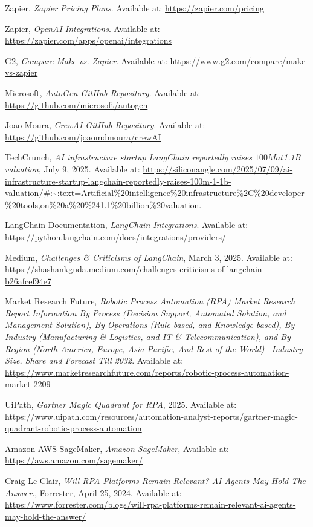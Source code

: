 \documentclass[11pt, a4paper, oneside]{article}
\begin{document}
\begin{thebibliography}{99}
    Zapier, \textit{Zapier Pricing Plans}. Available at: \url{https://zapier.com/pricing}


    Zapier, \textit{OpenAI Integrations}. Available at: \url{https://zapier.com/apps/openai/integrations}

    G2, \textit{Compare Make vs. Zapier}. Available at: \url{https://www.g2.com/compare/make-vs-zapier}


    Microsoft, \textit{AutoGen GitHub Repository}. Available at: \url{https://github.com/microsoft/autogen}

    Joao Moura, \textit{CrewAI GitHub Repository}. Available at: \url{https://github.com/joaomdmoura/crewAI}

    TechCrunch, \textit{AI infrastructure startup LangChain reportedly raises $100M at $1.1B valuation}, July 9, 2025. Available at: \url{https://siliconangle.com/2025/07/09/ai-infrastructure-startup-langchain-reportedly-raises-100m-1-1b-valuation/#:~:text=Artificial%20intelligence%20infrastructure%2C%20developer%20tools,on%20a%20%241.1%20billion%20valuation.}

    LangChain Documentation, \textit{LangChain Integrations}. Available at: \url{https://python.langchain.com/docs/integrations/providers/}

    Medium, \textit{Challenges \& Criticisms of LangChain}, March 3, 2025. Available at: \url{https://shashankguda.medium.com/challenges-criticisms-of-langchain-b26afcef94e7}

    Market Research Future, \textit{Robotic Process Automation (RPA) Market Research Report Information By Process (Decision Support, Automated Solution, and Management Solution), By Operations (Rule-based, and Knowledge-based), By Industry (Manufacturing \& Logistics, and IT \& Telecommunication), and By Region (North America, Europe, Asia-Pacific, And Rest of the World) –Industry Size, Share and Forecast Till 2032}. Available at: \url{https://www.marketresearchfuture.com/reports/robotic-process-automation-market-2209}

    UiPath, \textit{Gartner Magic Quadrant for RPA}, 2025. Available at:
    \url{https://www.uipath.com/resources/automation-analyst-reports/gartner-magic-quadrant-robotic-process-automation}

    Amazon AWS SageMaker, \textit{Amazon SageMaker}, Available at: \url{https://aws.amazon.com/sagemaker/}

    Craig Le Clair, \textit{Will RPA Platforms Remain Relevant? AI Agents May Hold The Answer.}, Forrester, April 25, 2024. Available at: \url{https://www.forrester.com/blogs/will-rpa-platforms-remain-relevant-ai-agents-may-hold-the-answer/}

\end{thebibliography}
\end{document}

